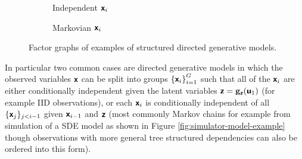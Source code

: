 \begin{figure}[!t]
\centering
\begin{subfigure}[t]{.35\linewidth}
\centering
{}
\caption{Independent $\boldsymbol{\mathsf{x}}_i$}\label{sfig:directed-model-independent}
\end{subfigure}%
\begin{subfigure}[t]{.62\linewidth}
\centering
{}
\caption{Markovian $\boldsymbol{\mathsf{x}}_i$}\label{sfig:directed-model-markov}
\end{subfigure}%
\caption[Structured directed generative models.]{Factor graphs of examples of structured directed generative models.}
\label{fig:directed-model-structure-examples}
\end{figure}

In particular two common cases are directed generative models in which the observed variables $\boldsymbol{\mathsf{x}}$ can be split into groups $\fset{\rvct{x}_i}_{i=1}^G$ such that all of the $\boldsymbol{\mathsf{x}}_i$ are either conditionally independent given the latent variables $\boldsymbol{\mathsf{z}} = {\mathbf{g}}_{\boldsymbol{\mathsf{z}}}(\boldsymbol{\mathsf{u}}_1)$ (for example \acs{IID} observations), or each $\boldsymbol{\mathsf{x}}_i$ is conditionally independent of all $\lbrace \boldsymbol{\mathsf{x}}_j \rbrace_{j<i-1}$ given $\boldsymbol{\mathsf{x}}_{i-1}$ and $\boldsymbol{\mathsf{z}}$ (most commonly Markov chains for example from simulation of a \acs{SDE} model as shown in Figure \ref{fig:simulator-model-example} though observations with more general tree structured dependencies can also be ordered into this form). 

